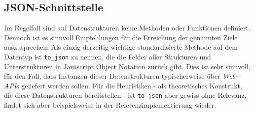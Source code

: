 \subsection{JSON-Schnittstelle}
Im Regelfall sind auf Datenstrukturen keine Methoden oder Funktionen definiert. Dennoch ist es sinnvoll Empfehlungen für die Erreichung der genannten Ziele auszusprechen: Als einzig derzeitig wichtige standardisierte Methode auf dem Datentyp ist \texttt{to\_json} zu nennen, die die Felder aller Strukturen und Unterstrukturen in Javascript Object Notation\cite{jsonspec} zurück gibt. Dies ist sehr sinnvoll, für den Fall, dass Instanzen dieser Datenstrukturen typischerweise über \textit{Web-API}s geliefert werden sollen. Für die Heuristiken - als theoretisches Konstrukt, die diese Datenstrukturen bereitstellen - ist \texttt{to\_json} aber gewiss ohne Relevanz, findet sich aber beispielsweise in der Referenzimplementierung wieder.
